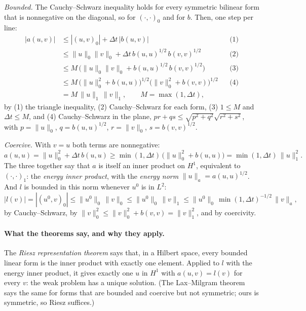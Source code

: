 \emph{Bounded.} The Cauchy--Schwarz inequality holds for every symmetric bilinear form that is nonnegative on the diagonal, so for $(\cdot, \cdot)_0$ and for $b$. Then, one step per line:
\begin{align*}
|a(u, v)| &\le |(u, v)_0| + \Delta t\, |b(u, v)| && \text{(1)} \\
&\le \|u\|_0\|v\|_0 + \Delta t\, b(u, u)^{1/2}\, b(v, v)^{1/2} && \text{(2)} \\
&\le M\,\big(\|u\|_0\|v\|_0 + b(u, u)^{1/2}\, b(v, v)^{1/2}\big) && \text{(3)} \\
&\le M\,\big(\|u\|_0^2 + b(u, u)\big)^{1/2}\big(\|v\|_0^2 + b(v, v)\big)^{1/2} && \text{(4)} \\
&= M\, \|u\|_1\, \|v\|_1 , \qquad M = \max(1, \Delta t) ,
\end{align*}
by (1) the triangle inequality, (2) Cauchy--Schwarz for each form, (3) $1 \le M$ and $\Delta t \le M$, and (4) Cauchy--Schwarz in the plane, $pr + qs \le \sqrt{p^2 + q^2}\sqrt{r^2 + s^2}$, with $p = \|u\|_0$, $q = b(u, u)^{1/2}$, $r = \|v\|_0$, $s = b(v, v)^{1/2}$.

\emph{Coercive.} With $v = u$ both terms are nonnegative:
\begin{equation*}
a(u, u) = \|u\|_0^2 + \Delta t\, b(u, u) \ge \min(1, \Delta t)\,\big(\|u\|_0^2 + b(u, u)\big) = \min(1, \Delta t)\, \|u\|_1^2 .
\end{equation*}
The three together say that $a$ is itself an inner product on $H^1$, equivalent to $(\cdot, \cdot)_1$: the \emph{energy inner product}, with the \emph{energy norm} $\|u\|_a = a(u, u)^{1/2}$. And $l$ is bounded in this norm whenever $u^0$ is in $L^2$:
\begin{equation*}
|l(v)| = |(u^0, v)_0| \le \|u^0\|_0\, \|v\|_0 \le \|u^0\|_0\, \|v\|_1 \le \|u^0\|_0\, \min(1, \Delta t)^{-1/2}\, \|v\|_a ,
\end{equation*}
by Cauchy--Schwarz, by $\|v\|_0^2 \le \|v\|_0^2 + b(v, v) = \|v\|_1^2$, and by coercivity.

\paragraph{What the theorems say, and why they apply.} The \emph{Riesz representation theorem} says that, in a Hilbert space, every bounded linear form is the inner product with exactly one element. Applied to $l$ with the energy inner product, it gives exactly one $u$ in $H^1$ with $a(u, v) = l(v)$ for every $v$: the weak problem has a unique solution. (The Lax--Milgram theorem says the same for forms that are bounded and coercive but not symmetric; ours is symmetric, so Riesz suffices.)

